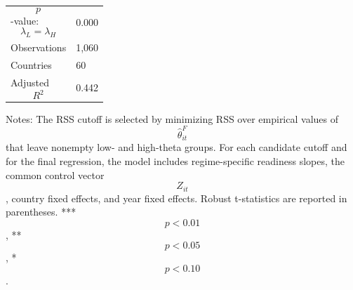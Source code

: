 \begin{table}[H]
\begin{threeparttable}
\begin{tabularx}{\textwidth}{lY}
$$p$$-value: $$\lambda_L=\lambda_H$$ & 0.000 \\
Observations & 1,060 \\
Countries & 60 \\
Adjusted $$R^2$$ & 0.442 \\
\bottomrule
\end{tabularx}
\begin{tablenotes}[flushleft]\footnotesize
\item Notes: The RSS cutoff is selected by minimizing RSS over empirical values of $$\widehat{\theta}^{F}_{it}$$ that leave nonempty low- and high-theta groups. For each candidate cutoff and for the final regression, the model includes regime-specific readiness slopes, the common control vector $$Z_{it}$$, country fixed effects, and year fixed effects. Robust t-statistics are reported in parentheses. *** $$p<0.01$$, ** $$p<0.05$$, * $$p<0.10$$.
\end{tablenotes}
\end{threeparttable}
\end{table}
